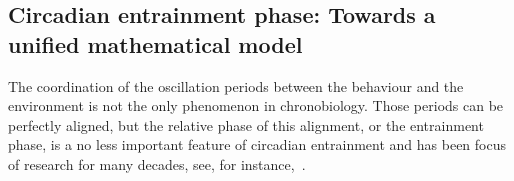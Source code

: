 \subsection{Circadian entrainment phase: Towards a unified mathematical
model}

The coordination of the oscillation periods between the behaviour and
the environment is not the only phenomenon in chronobiology. Those
periods can be perfectly aligned, but the relative phase of this
alignment, or the entrainment phase, is a no less important feature of
circadian entrainment and has been focus of research for many decades,
see, for instance,~\cite{pittendrigh1981circadian}.
